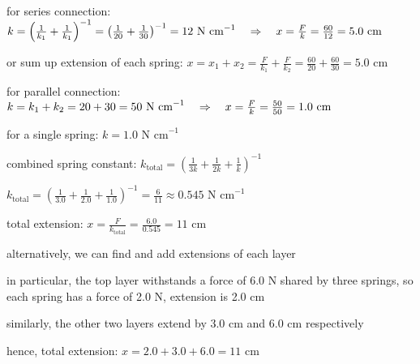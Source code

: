 \begin{soln} for series connection: $k = \left(\frac{1}{k_1} + \frac{1}{k_1}\right)^{-1} = \left( \frac{1}{20} + \frac{1}{30} \right)^{-1} = 12 \text{ N cm}^{-1} \quad \Rightarrow \quad x = \frac{F}{k} = \frac{60}{12} = 5.0 \text{ cm}$

\eqskip or sum up extension of each spring: $x = x_1 + x_2 = \frac{F}{k_1} + \frac{F}{k_2} = \frac{60}{20} + \frac{60}{30} = 5.0 \text{ cm}$

for parallel connection: $k = k_1 + k_2 = 20 + 30 = 50 \text{ N cm}^{-1} \quad \Rightarrow \quad x = \frac{F}{k} = \frac{50}{50} = 1.0 \text{ cm} $ \eoe
\end{soln}
\begin{marginfigure}
	\vspace*{-5pt}
	\centering
	\vspace*{-16pt}
\end{marginfigure}



\begin{soln} for a single spring: $k = 1.0 \text{ N cm}^{-1}$

combined spring constant: $k_\text{total} = \left( \frac{1}{3k} + \frac{1}{2k} + \frac{1}{k} \right)^{-1}$

{
	\centering
	
	\eqyskip $ k_\text{total} = \left(\frac{1}{3.0} + \frac{1}{2.0} + \frac{1}{1.0} \right)^{-1} = \frac{6}{11} \approx 0.545 \text{ N cm}^{-1}$
	
}

total extension: $x = \frac{F}{k_\text{total}} = \frac{6.0}{0.545} = 11 \text{ cm}$

alternatively, we can find and add extensions of each layer

in particular, the top layer withstands a force of 6.0 N shared by three springs, so each spring has a force of 2.0 N, extension is 2.0 cm

similarly, the other two layers extend by 3.0 cm and 6.0 cm respectively

hence, total extension: $x = 2.0 + 3.0 + 6.0 = 11 \text{ cm}$ \end{soln}




